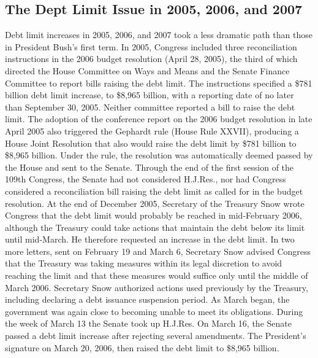 \subsection{The Dept Limit Issue in 2005, 2006, and 2007}
Debt limit increases in 2005, 2006, and 2007 took a less dramatic path than those in President Bush’s first term. In 2005, Congress included three reconciliation instructions in the 2006 budget resolution (April 28, 2005), the third of which directed the House Committee on Ways and Means and the Senate Finance Committee to report bills raising the debt limit. The instructions specified a \$781 billion debt limit increase, to \$8,965 billion, with a reporting date of no later than September 30, 2005. Neither committee reported a bill to raise the debt limit.
\newline \newline
The adoption of the conference report on the 2006 budget resolution in late April 2005 also triggered the Gephardt rule (House Rule XXVII), producing a House Joint Resolution that also would raise the debt limit by \$781 billion to \$8,965 billion. Under the rule, the resolution was automatically deemed passed by the House and sent to the Senate. Through the end of the first session of the 109th Congress, the Senate had not considered H.J.Res., nor had Congress considered a reconciliation bill raising the debt limit as called for in the budget resolution.
\newline \newline
At the end of December 2005, Secretary of the Treasury Snow wrote Congress that the debt limit would probably be reached in mid-February 2006, although the Treasury could take actions that maintain the debt below its limit until mid-March. He therefore requested an increase in the debt limit. In two more letters, sent on February 19 and March 6, Secretary Snow advised Congress that the Treasury was taking measures within its legal discretion to avoid reaching the limit and that these measures would suffice only until the middle of March 2006. Secretary Snow authorized actions used previously by the Treasury, including declaring a debt issuance suspension period. As March began, the government was again close to becoming unable to meet its obligations. During the week of March 13 the Senate took up H.J.Res. On March 16, the Senate passed a debt limit increase after rejecting several amendments. The President’s signature on March 20, 2006, then raised the debt limit to \$8,965 billion.
\newline \newline
